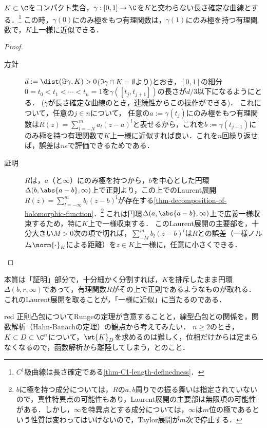 \documentclass[uplatex, dvipdfmx]{jsreport}
\begin{document}
\begin{lemma}[有理式の極の曲線に沿った移動]\label{lemma-transportation-of-poles-of-rational-functions}
    $K\subset\C$をコンパクト集合，$\gamma:[0,1]\to\C$を$K$と交わらない長さ確定な曲線とする．\footnote{$C^1$級曲線は長さ確定である\ref{thm-C1-length-definedness}．}
    この時，$\gamma(0)$にのみ極をもつ有理関数は，$\gamma(1)$にのみ極を持つ有理関数で，$K$上一様に近似できる．
\end{lemma}
\begin{proof}\mbox{}
    \begin{description}
        \item[方針] $d:=\dist(\Im\gamma,K)>0$($\Im\gamma\cap K=\emptyset$より)とおき，$[0,1]$の細分$0=t_0<t_1<\cdots<t_n=1$を$\gamma([t_j,t_{j+1}])$の長さが$d/3$以下になるようにとる．
        ($\gamma$が長さ確定な曲線のとき，連続性からこの操作ができる)．
        これについて，任意の$j\in n$について，
        任意の$a:=\gamma(t_j)$にのみ極をもつ有理関数は$R(z)=\sum_{l=-N}^ma_l(z-a)^l$と表せるから，これを$b:=\gamma(t_{j+1})$にのみ極を持つ有理関数で$K$上一様に近似すれば良い．これを$n$回繰り返せば，誤差は$n\epsilon$で評価できるためである．
        \item[証明]
        $R$は，$a$（と$\infty$）にのみ極を持つから，$b$を中心とした円環$\Delta(b,\abs{a-b},\infty)$上で正則より，この上でのLaurent展開$R(z)=\sum_{l=-\infty}^mb_l(z-b)^l$が存在する\ref{thm-decomposition-of-holomorphic-function}．\footnote{$b$に極を持つ成分については，$R$の$a,b$周りでの振る舞いは指定されていないので，真性特異点の可能性もあり，Laurent展開の主要部は無限項の可能性がある．しかし，$\infty$を特異点とする成分については，$\infty$は$m$位の極であるという性質は変わってはいけないので，Taylor展開が$m$次で停止する．}
        これは円環$\Delta(a,\abs{a-b},\infty)$上で広義一様収束するため，特に$K$上で一様収束する．
        このLaurent展開の主要部を，十分大きい$M>0$次の項で切れば，$\sum^m_{-M}b_l(z-b)^l$は$R$との誤差（一様ノルム$\norm{\cdot}_K$による距離）を$z\in K$上一様に，任意に小さくできる．
    \end{description}
\end{proof}
\begin{remarks}
    本質は「証明」部分で，十分細かく分割すれば，$K$を排斥したまま円環$\Delta(b,r,\infty)$であって，有理関数$R$がその上で正則であるようなものが取れる．
    これのLaurent展開を取ることが，「一様に近似」に当たるのである．
\end{remarks}

\begin{tbox}{red}{}
    正則凸包についてRungeの定理が含意することと，線型凸包との関係を，関数解析（Hahn-Banachの定理）の観点から考えてみたい．
    $n\ge 2$のとき，$K\subset D\subset\C^n$について，$\wt{K}_D$を求めるのは難しく，位相だけからは定まらなくなるので，函数解析から離陸してしまう，とのこと．
\end{tbox}
\end{document}
